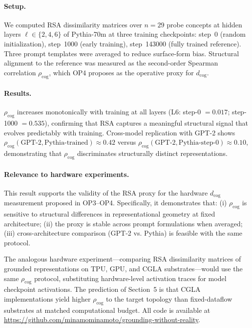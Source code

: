 \documentclass[12pt]{article}
\begin{document}
\paragraph{Setup.}
We computed RSA dissimilarity matrices over $n = 29$ probe concepts
at hidden layers $\ell \in \{2, 4, 6\}$ of Pythia-70m
\cite{biderman2023} at three training checkpoints: step~0 (random
initialization), step~1000 (early training), step~143000 (fully
trained reference).
Three prompt templates were averaged to reduce surface-form bias.
Structural alignment to the reference was measured as the
second-order Spearman correlation $\rho_\mathrm{cog}$, which OP4
proposes as the operative proxy for $d_\mathrm{cog}$.

\paragraph{Results.}
$\rho_\mathrm{cog}$ increases monotonically with training at all
layers (L6: step-0 $= 0.017$; step-1000 $= 0.535$), confirming
that RSA captures a meaningful structural signal that evolves
predictably with training.
Cross-model replication with GPT-2 \cite{radford2019language}
shows $\rho_\mathrm{cog}(\text{GPT-2}, \text{Pythia-trained})
\approx 0.42$ versus $\rho_\mathrm{cog}(\text{GPT-2},
\text{Pythia-step-0}) \approx 0.10$, demonstrating that
$\rho_\mathrm{cog}$ discriminates structurally distinct
representations.

\paragraph{Relevance to hardware experiments.}
This result supports the validity of the RSA proxy for the
hardware $d_\mathrm{cog}$ measurement proposed in OP3--OP4.
Specifically, it demonstrates that:
(i) $\rho_\mathrm{cog}$ is sensitive to structural differences
in representational geometry at fixed architecture;
(ii) the proxy is stable across prompt formulations when averaged;
(iii) cross-architecture comparison (GPT-2 vs. Pythia) is
feasible with the same protocol.

The analogous hardware experiment---comparing RSA dissimilarity
matrices of grounded representations on TPU, GPU, and CGLA
substrates---would use the same $\rho_\mathrm{cog}$ protocol,
substituting hardware-level activation traces for model
checkpoint activations.
The prediction of Section~5 is that CGLA implementations yield
higher $\rho_\mathrm{cog}$ to the target topology than fixed-dataflow
substrates at matched computational budget.
All code is available at
\url{https://github.com/minamominamoto/grounding-without-reality}.
\end{document}

